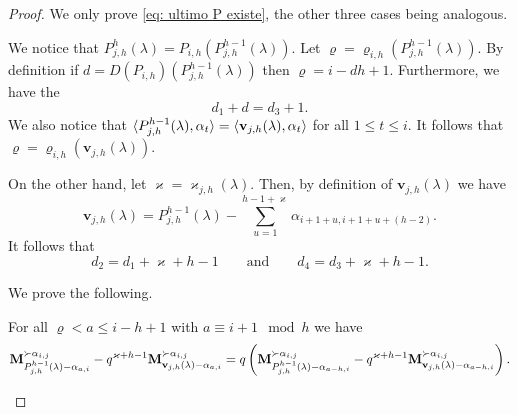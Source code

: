 \begin{proof}
    We only prove \cref{eq: ultimo P existe}, the other three cases being analogous. 

We  notice that $P_{j,h}^{h}(\lambda) = P_{i,h}(P_{j,h}^{h-1} (\lambda) ) $. 
Let  $\varrho=\varrho_{i,h}(P_{j,h}^{h-1} (\lambda)) $. 
By definition if $d=D(P_{i,h} )(P_{j,h}^{h-1} (\lambda))$ then $\varrho = i -dh+1$. 
Furthermore, we have the 
\begin{equation}\label{eq:degreesA}
    d_1+d=d_3+1.
\end{equation}
We also notice that $\langle P_{j,h}^{h-1} (\lambda) , \alpha_t \rangle =     \langle \mathbf{v}_{j,h}(\lambda) , \alpha_t \rangle  $  for all $1\leq t \leq i$. 
It follows that $\varrho = \varrho_{i,h} (  \mathbf{v}_{j,h}(\lambda) )$.

On the other hand, let $\varkappa = \varkappa_{j,h}(\lambda) $.
Then, by definition of $\mathbf{v}_{j,h}(\lambda)$ we have 
\begin{equation}\label{eq: relation P con v negrita}
    \mathbf{v}_{j,h}(\lambda) = P^{h-1}_{j,h}(\lambda) -\sum_{u=1}^{h-1+\varkappa}  \alpha_{i+1+u,i+1+u+(h-2)}.
\end{equation}
It follows that 
\begin{equation}\label{eq:degreesB}
    d_2=d_1 + \varkappa +h -1  \qquad \mbox{and} \qquad d_4=d_3 + \varkappa +h -1.
\end{equation}


We prove the following.

\begin{claim}\label{claim complicado}
For all  $\varrho < a \leq i-h+1$ with $a\equiv i+1 \mod h$ we have
\begin{equation}
   \mathbf{M}_{P_{j,h}^{h-1}(\lambda) - \alpha_{a,i}}^{\succ \alpha_{i,j}} - q^{\varkappa+h-1} \mathbf{M}_{\mathbf{v}_{j,h}(\lambda)-\alpha_{a,i}}^{\succ \alpha_{i,j}}  = q  \left( \mathbf{M}_{P_{j,h}^{h-1}(\lambda)-\alpha_{a-h,i}}^{\succ \alpha_{i,j}} - q^{\varkappa+h-1} \mathbf{M}_{\mathbf{v}_{j,h}(\lambda)- \alpha_{a-h,i}}^{\succ \alpha_{i,j}} \right).
\end{equation}   
\end{claim}


\end{proof}
